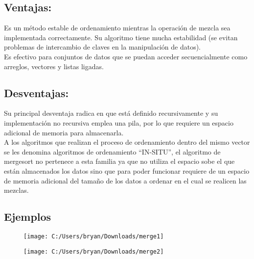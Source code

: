 \documentclass[]{article}
\begin{document}
\subsection{Ventajas:}
Es un método estable de ordenamiento mientras la operación de mezcla sea implementada correctamente.
Su algoritmo tiene mucha estabilidad (se evitan problemas de intercambio de claves en la manipulación de datos).\\
Es efectivo para conjuntos de datos que se puedan acceder secuencialmente como arreglos, vectores y listas ligadas.\\

\subsection{Desventajas:}
Su principal desventaja radica en que está definido recursivamente y su implementación no recursiva emplea una pila, por lo que requiere un espacio adicional de memoria para almacenarla.\\
A los algoritmos que realizan el proceso de ordenamiento dentro del mismo vector se les denomina algoritmos de ordenamiento “IN-SITU”, el algoritmo de mergesort no pertenece a esta familia ya que no utiliza el espacio sobe el que están almacenados los datos sino que para poder funcionar requiere de un espacio de memoria adicional del tamaño de los datos a ordenar en el cual se realicen las mezclas.\\
\newpage
\subsection{Ejemplos}
\begin{figure}[h]
	\centering
	\texttt{[image: C:/Users/bryan/Downloads/merge1]}
	\caption{}
	\label{fig:merge1}
\end{figure}
\begin{figure}[h]
	\centering
	\texttt{[image: C:/Users/bryan/Downloads/merge2]}
	\caption{}
	\label{fig:merge2}
\end{figure}
\end{document}
